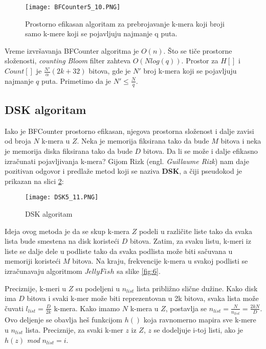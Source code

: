 \documentclass[12pt,oneside]{memoir}
\begin{document}
\begin{figure}[h]
\centering
\texttt{[image: BFCounter5\_10.PNG]}
\caption{Prostorno efikasan algoritam za prebrojavanje k-mera koji broji samo k-mere koji se pojavljuju najmanje q puta.}
\label{fig:7}
\end{figure}

Vreme izvršavanja BFCounter algoritma je $O(n)$. Što se tiče prostorne složenosti, \textit{counting Bloom} filter zahteva $O(N log(q))$. Prostor za $H[]$ i $Count[]$ je $\frac{N'}{\alpha}(2k + 32)$ bitova, gde je $N'$ broj k-mera koji se pojavljuju najmanje $q$ puta. Primetimo da je $N' \leq \frac{N}{q}$.

\newpage

\subsection{DSK algoritam}
Iako je BFCounter prostorno efikasan, njegova prostorna složenost i dalje zavisi od broja $N$ k-mera u $Z$. Neka je memorija fiksirana tako da bude $M$ bitova i neka je memorija diska fiksirana tako da bude $D$ bitova. Da li se može i dalje efikasno izračunati pojavljivanja k-mera? Gijom Rizk (engl. \textit{Guillaume Rizk}) nam daje pozitivan odgovor i predlaže metod koji se naziva \textbf{DSK}, a čiji pseudokod je prikazan na slici \ref{fig:66}:

\begin{figure}[h]
\centering
\texttt{[image: DSK5\_11.PNG]}
\caption{DSK algoritam}
\label{fig:66}
\end{figure}

Ideja ovog metoda je da se skup k-mera $Z$ podeli u različite liste tako da svaka lista bude smestena na disk koristeći $D$ bitova. Zatim, za svaku listu, k-meri iz liste se dalje dele u podliste tako da svaka podlista može biti sačuvana u memoriji koristeći $M$ bitova. Na kraju, frekvencije k-mera u svakoj podlisti se izračunavaju algoritmom $JellyFish$ sa slike \ref{fig:6}.

Preciznije, k-meri u $Z$ su podeljeni u $n_{list}$ lista približno slične dužine. Kako disk ima $D$ bitova i svaki k-mer može biti reprezentovan u 2k bitova, svaka lista može čuvati $l_{list} =  \frac{D}{2k}$ k-mera. Kako imamo $N$ k-mera u $Z$, postavlja se $n_{list} = \frac{N}{n_{list}} = \frac{2kN}{D}$. Ovo deljenje se obavlja heš funkcijom $h()$ koja ravnomerno mapira sve k-mere u $n_{list}$ lista. Preciznije, za svaki k-mer $z$ iz $Z$, $z$ se dodeljuje i-toj listi, ako je $h(z)$ \textit{mod} $n_{list} = i$. 
\end{document}
